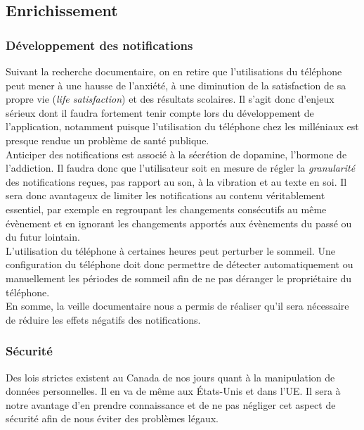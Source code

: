 	\subsection{Enrichissement}
	
		\subsubsection{Développement des notifications}

		Suivant la recherche documentaire, on en retire que l'utilisations du téléphone peut mener à une hausse de l'anxiété, à une diminution de la satisfaction de sa propre vie (\emph{life satisfaction}) et des résultats scolaires. Il s'agit donc d'enjeux sérieux dont il faudra fortement tenir compte lors du développement de l'application, notamment puisque l'utilisation du téléphone chez les milléniaux est presque rendue un problème de santé publique. \\
		
		Anticiper des notifications est associé à la sécrétion de dopamine, l'hormone de l'addiction. Il faudra donc que l'utilisateur soit en mesure de régler la \emph{granularité} des notifications reçues, pas rapport au son, à la vibration et au texte en soi. Il sera donc avantageux de limiter les notifications au contenu véritablement essentiel, par exemple en regroupant les changements consécutifs au même évènement et en ignorant les changements apportés aux évènements du passé ou du futur lointain. \\
			
		L'utilisation du téléphone à certaines heures peut perturber le sommeil. Une configuration du téléphone doit donc permettre de détecter automatiquement ou manuellement les périodes de sommeil afin de ne pas déranger le propriétaire du téléphone. \\
		
		En somme, la veille documentaire nous a permis de réaliser qu'il sera nécessaire de réduire les effets négatifs des notifications.
	
		\subsubsection{Sécurité}
		Des lois strictes existent au Canada de nos jours quant à la manipulation de données personnelles. Il en va de même aux États-Unis et dans l'UE. Il sera à notre avantage d'en prendre connaissance et de ne pas négliger cet aspect de sécurité afin de nous éviter des problèmes légaux. \\
		
